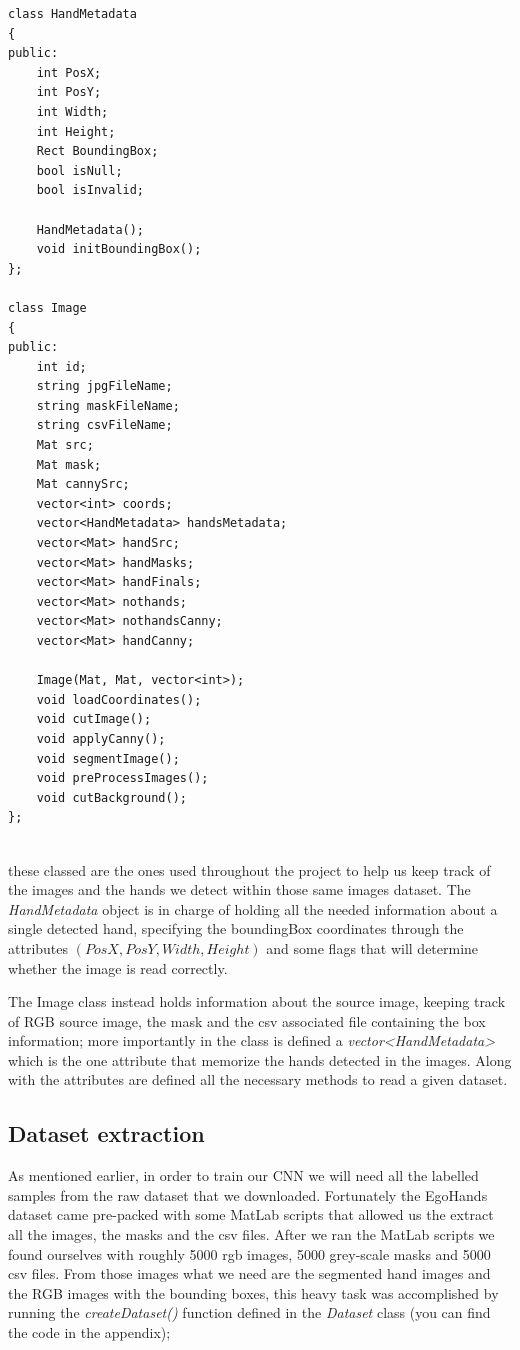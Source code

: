 \begin{lstlisting}[]
    class HandMetadata
{
public:
    int PosX;
    int PosY;
    int Width;
    int Height;
    Rect BoundingBox;
    bool isNull;
    bool isInvalid;

    HandMetadata();
    void initBoundingBox();
};

class Image
{
public:
    int id;
    string jpgFileName;
    string maskFileName;
    string csvFileName;
    Mat src;
    Mat mask;
    Mat cannySrc;
    vector<int> coords;
    vector<HandMetadata> handsMetadata;
    vector<Mat> handSrc;
    vector<Mat> handMasks;
    vector<Mat> handFinals;
    vector<Mat> nothands;
    vector<Mat> nothandsCanny;
    vector<Mat> handCanny;

    Image(Mat, Mat, vector<int>);
    void loadCoordinates();
    void cutImage();
    void applyCanny();
    void segmentImage();
    void preProcessImages();
    void cutBackground();
};


\end{lstlisting}

these classed are the ones used throughout the project to help us keep track of the images and the hands we detect within those same images dataset.
The \textit{HandMetadata} object is in charge of holding all the needed information about a single detected hand, specifying the boundingBox coordinates 
through the attributes $(PosX, PosY, Width, Height)$ and some flags that will determine whether the image is read correctly.

The Image class instead holds information about the source image, keeping track of RGB source image, the mask and the csv associated file containing the box information;
more importantly in the class is defined a \textit{vector<HandMetadata>} which is the one attribute that memorize the hands detected in the images. Along with the attributes
are defined all the necessary methods to read a given dataset.

\subsection{Dataset extraction}
As mentioned earlier, in order to train our CNN we will need all the labelled samples from the raw dataset that we downloaded. Fortunately the EgoHands dataset came 
pre-packed with some MatLab scripts that allowed us the extract all the images, the masks and the csv files. After we ran the MatLab scripts we found ourselves with roughly 5000 
rgb images, 5000 grey-scale masks and 5000 csv files. From those images what we need are the segmented hand images and the RGB images with the bounding boxes, this heavy 
task was accomplished by running the \textit{createDataset()} function defined in the \textit{Dataset} class (you can find the code in the appendix); 

